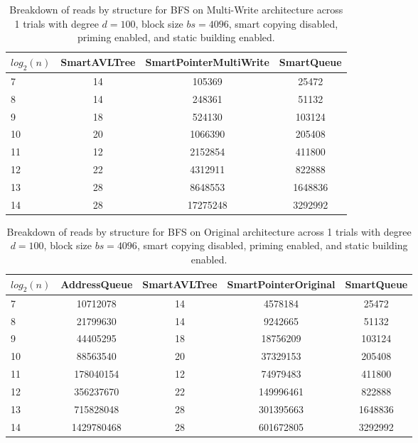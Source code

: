 \begin{table}[]
\centering
\begin{tabular}{|l|c|c|c|}
$log_2(n)$ & SmartAVLTree & SmartPointerMultiWrite & SmartQueue \\ \hline
7 & 14 & 105369 & 25472 \\ \hline
8 & 14 & 248361 & 51132 \\ \hline
9 & 18 & 524130 & 103124 \\ \hline
10 & 20 & 1066390 & 205408 \\ \hline
11 & 12 & 2152854 & 411800 \\ \hline
12 & 22 & 4312911 & 822888 \\ \hline
13 & 28 & 8648553 & 1648836 \\ \hline
14 & 28 & 17275248 & 3292992 \\ \hline
\end{tabular}
\caption{Breakdown of reads by structure for BFS on Multi-Write architecture across 1 trials with degree $d=100$, block size $bs=4096$, smart copying disabled, priming enabled, and static building enabled.}
    \label{tab:reads_by_structure_bfs_d100_bs4096_trials1_copiesfalse_primetrue_staticinsertiontrue_ptmultiwrite_movetrue}
\end{table}

\begin{table}[]
\centering
\begin{tabular}{|l|c|c|c|c|}
$log_2(n)$ & AddressQueue & SmartAVLTree & SmartPointerOriginal & SmartQueue \\ \hline
7 & 10712078 & 14 & 4578184 & 25472 \\ \hline
8 & 21799630 & 14 & 9242665 & 51132 \\ \hline
9 & 44405295 & 18 & 18756209 & 103124 \\ \hline
10 & 88563540 & 20 & 37329153 & 205408 \\ \hline
11 & 178040154 & 12 & 74979483 & 411800 \\ \hline
12 & 356237670 & 22 & 149996461 & 822888 \\ \hline
13 & 715828048 & 28 & 301395663 & 1648836 \\ \hline
14 & 1429780468 & 28 & 601672805 & 3292992 \\ \hline
\end{tabular}
\caption{Breakdown of reads by structure for BFS on Original architecture across 1 trials with degree $d=100$, block size $bs=4096$, smart copying disabled, priming enabled, and static building enabled.}
    \label{tab:reads_by_structure_bfs_d100_bs4096_trials1_copiesfalse_primetrue_staticinsertiontrue_ptoriginal_movefalse}
\end{table}

